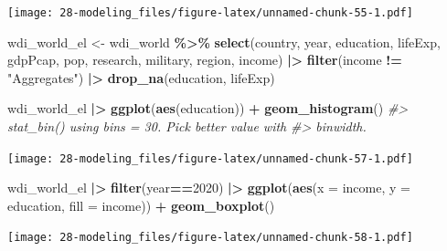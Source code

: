\documentclass[
  xelatex, ja=standard]{bxjsbook}
\newenvironment{Shaded}{\begin{snugshade}}{\end{snugshade}}
\newcommand{\AttributeTok}[1]{\textcolor[rgb]{0.13,0.29,0.53}{#1}}
\newcommand{\CommentTok}[1]{\textcolor[rgb]{0.56,0.35,0.01}{\textit{#1}}}
\newcommand{\DecValTok}[1]{\textcolor[rgb]{0.00,0.00,0.81}{#1}}
\newcommand{\FunctionTok}[1]{\textcolor[rgb]{0.13,0.29,0.53}{\textbf{#1}}}
\newcommand{\NormalTok}[1]{#1}
\newcommand{\OtherTok}[1]{\textcolor[rgb]{0.56,0.35,0.01}{#1}}
\newcommand{\SpecialCharTok}[1]{\textcolor[rgb]{0.81,0.36,0.00}{\textbf{#1}}}
\newcommand{\StringTok}[1]{\textcolor[rgb]{0.31,0.60,0.02}{#1}}
\theoremstyle{definition}
\theoremstyle{definition}
\theoremstyle{definition}
\theoremstyle{definition}
\theoremstyle{remark}
\begin{document}
\texttt{[image: 28-modeling\_files/figure-latex/unnamed-chunk-55-1.pdf]}

\begin{Shaded}
\begin{Highlighting}[]
\NormalTok{wdi\_world\_el }\OtherTok{\textless{}{-}}\NormalTok{ wdi\_world }\SpecialCharTok{\%\textgreater{}\%} \FunctionTok{select}\NormalTok{(country, year, education, lifeExp, gdpPcap, pop, research, military, region, income) }\SpecialCharTok{|\textgreater{}} \FunctionTok{filter}\NormalTok{(income }\SpecialCharTok{!=} \StringTok{"Aggregates"}\NormalTok{) }\SpecialCharTok{|\textgreater{}} \FunctionTok{drop\_na}\NormalTok{(education, lifeExp)}
\end{Highlighting}
\end{Shaded}

\begin{Shaded}
\begin{Highlighting}[]
\NormalTok{wdi\_world\_el }\SpecialCharTok{|\textgreater{}} \FunctionTok{ggplot}\NormalTok{(}\FunctionTok{aes}\NormalTok{(education)) }\SpecialCharTok{+} \FunctionTok{geom\_histogram}\NormalTok{()}
\CommentTok{\#\textgreater{} \textasciigrave{}stat\_bin()\textasciigrave{} using \textasciigrave{}bins = 30\textasciigrave{}. Pick better value with}
\CommentTok{\#\textgreater{} \textasciigrave{}binwidth\textasciigrave{}.}
\end{Highlighting}
\end{Shaded}

\texttt{[image: 28-modeling\_files/figure-latex/unnamed-chunk-57-1.pdf]}

\begin{Shaded}
\begin{Highlighting}[]
\NormalTok{wdi\_world\_el }\SpecialCharTok{|\textgreater{}} \FunctionTok{filter}\NormalTok{(year}\SpecialCharTok{==}\DecValTok{2020}\NormalTok{) }\SpecialCharTok{|\textgreater{}} \FunctionTok{ggplot}\NormalTok{(}\FunctionTok{aes}\NormalTok{(}\AttributeTok{x =}\NormalTok{ income, }\AttributeTok{y =}\NormalTok{ education, }\AttributeTok{fill =}\NormalTok{ income)) }\SpecialCharTok{+} \FunctionTok{geom\_boxplot}\NormalTok{()}
\end{Highlighting}
\end{Shaded}

\texttt{[image: 28-modeling\_files/figure-latex/unnamed-chunk-58-1.pdf]}
\end{document}
